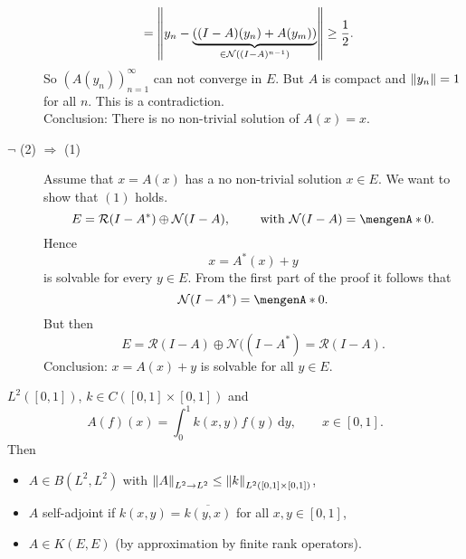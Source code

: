 \begin{beweis}
\begin{description}
\begin{align*}
			&=  \norm{y_n - \underset{\in \mathcal{N}((I-A)^{n-1})}{\underbrace{((I-A)(y_n) + A(y_m))}}} \geq \frac{1}{2}.
		\end{align*}
		So $(A(y_n))_{n=1}^{\infty}$ can not converge in $E$. But $A$ is compact and $\norm{y_n}=1$ for all $n$. This is a contradiction. \\
		Conclusion: There is no non-trivial solution of $A(x)=x$.
		\item[$\lnot$ (2) $\Rightarrow$ (1)] Assume that $x = A(x)$ has a no non-trivial solution $x \in E$. We want to show that $(1)$ holds.
		\[
			E = \mathcal{R}(I-A^*) \oplus \mathcal{N}(I-A), \qquad \text{ with }\mathcal{N}(I-A) = \set{0}.
		\]
		Hence 
		\[
			x = A^*(x)+y
		\] is solvable for every $y \in E$. From the first part of the proof it follows that 
		\[
			\mathcal{N}(I-A^*) = \set{0}.
		\]
		But then
		\[
			E = \mathcal{R}(I-A) \oplus \mathcal{N}((I-A^*) = \mathcal{R}(I-A).
		\]
		Conclusion: $x = A(x) + y$ is solvable for all $y \in E$.
	\end{description}
\end{beweis}

\begin{beispiel}
	$L^2([0,1])$, $k \in C([0,1] \times [0,1])$ and
	\[
		A(f)(x) = \int_{0}^{1}k(x,y)f(y) \,\mathrm{d}y , \qquad x \in [0,1].
	\]
	Then
	\begin{itemize}
		\item $A \in B(L^2,L^2)$ with $\norm{A}_{L^2 \to L^2} \leq \norm{k}_{L^2([0,1] \times [0,1])}$,
		\item $A$ self-adjoint if $k(x,y) = \overline{k(y,x)}$ for all $x,y \in [0,1]$,
		\item $A \in K(E,E)$ (by approximation by finite rank operators). 
	\end{itemize}
\end{beispiel}

